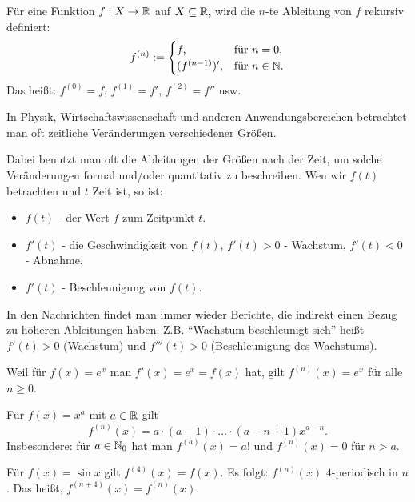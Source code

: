 \begin{defn} 
	Für eine Funktion $f : X \to \mathbb{R}$ auf $X \subseteq \mathbb{R}$, wird die $n$-te Ableitung von $f$ rekursiv definiert: 
	\[
	f^{(n)} := \begin{cases} 
	f, & \text{für} \ n =0,
	\\ (f^{(n-1)})', & \text{für} \ n \in \mathbb{N}. 
	\end{cases} 
	\]
	Das heißt: $f^{(0)} = f$, $f^{(1)} = f'$, $f^{(2)} = f''$ usw. 
\end{defn} 

\begin{bem}
	In Physik, Wirtschaftswissenschaft und anderen Anwendungsbereichen betrachtet man oft zeitliche Veränderungen verschiedener Größen. 
	
	Dabei benutzt man oft die Ableitungen der Größen nach der Zeit, um solche Veränderungen formal und/oder quantitativ zu beschreiben. Wen wir $f(t)$ betrachten und  $t$ Zeit ist, so ist: 
	\begin{itemize} 
		\item $f(t)$ - der Wert $f$ zum Zeitpunkt $t$. 
		\item $f'(t)$ - die Geschwindigkeit von $f(t)$, $f'(t)>0$ - Wachstum, $f'(t)<0$ - Abnahme. 
		\item $f'(t)$ - Beschleunigung von $f(t)$. 
	\end{itemize} 
\end{bem} 

\begin{bem}
	In den Nachrichten findet man immer wieder Berichte, die indirekt einen Bezug zu höheren Ableitungen haben. Z.B. ``Wachstum beschleunigt sich'' heißt $f'(t)>0$ (Wachstum) und $f'''(t)>0$ (Beschleunigung des Wachstums). 
\end{bem} 

\begin{bsp} 
	Weil für $f(x)=e^x$ man $f'(x) = e^x = f(x)$ hat, gilt $f^{(n)}(x) = e^x$ für alle $n \ge 0$. 
\end{bsp} 

\begin{bsp} 
	Für $f(x) = x^a$ mit $a \in \mathbb{R}$ gilt 
	\[
		f^{(n)}(x) = a \cdot (a-1) \cdot \ldots \cdot (a-n+1) x^{a-n}. 
	\]
	Insbesondere: für $a \in \mathbb{N}_0$ hat man $f^{(a)}(x) = a!$ und $f^{(n)}(x)=0$ für $n > a$. 
\end{bsp} 

\begin{bsp} 
	Für $f(x) = \sin x$ gilt $f^{(4)}(x) = f(x)$. Es folgt: $f^{(n)}(x)$ $4$-periodisch in $n$. Das heißt, $f^{(n+4)}(x) = f^{(n)}(x)$. 
\end{bsp} 



